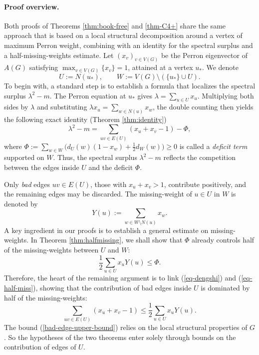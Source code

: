 \documentclass[10pt,a4paper]{amsart}
\renewcommand{\le}{\leqslant}
\renewcommand{\ge}{\geqslant}
\begin{document}
\paragraph{Proof overview.}
Both proofs of Theorems \ref{thm:book-free} and \ref{thm-C4+} share the same approach that is based on a local structural decomposition around a vertex of
maximum Perron weight, combining with an identity for the spectral surplus and a half-missing-weights estimate.   
Let $(x_v)_{v\in V(G)}$ be the Perron
eigenvector of $A(G)$ satisfying $\max_{v\in V(G)} \{x_v\}=1$, attained at a vertex
$u_*$. We denote 
\[ U:=N(u_*), \qquad W:=V(G)\setminus(\{u_*\}\cup U). \] 
To begin with, 
a standard step is to establish a formula that localizes the {spectral surplus}
$\lambda^2-m$. 
The Perron equation at $u_*$
gives $\lambda =\sum_{u\in U}x_u$. Multiplying both sides by $\lambda$ and substituting $\lambda x_u =\sum_{w\in N(u)} x_w$, the double counting then yields the following exact identity (Theorem \ref{thm:identity}) 
\begin{equation} \label{eq-dengshi}
\lambda^2-m=\sum_{uv\in E(U)}(x_u+x_v-1)-\Phi, 
\end{equation}
where $\Phi := \sum_{w\in W} \big(d_U(w)(1-x_w) + \frac{1}{2}d_W(w) \big) \ge 0$ is called a \emph{deficit term} supported on $W$. 
Thus, the spectral surplus $\lambda^2-m$ reflects the competition between the edges
inside $U$ and the deficit $\Phi$. 

Only \emph{bad} edges $uv\in E(U)$, those with $x_u+x_v >1$, 
contribute positively, and the remaining edges may be discarded. 
The missing-weight of $u\in U$ in $W$ is denoted by 
$$ Y(u):=\sum_{w\in W\setminus N(u)}x_w .$$ 
A key ingredient in our proofs is to establish a general estimate on missing-weights. In Theorem \ref{thm:halfmissing}, we shall show that $\Phi$ already controls
half of the missing-weights between $U$ and $W$:  
\begin{equation} \label{eq-half-miss}
     \frac12\sum_{u\in U}x_uY(u) \le \Phi. 
\end{equation} 
Therefore, the heart of the remaining argument is to link (\ref{eq-dengshi}) and (\ref{eq-half-miss}),  showing that the contribution of bad edges inside $U$ is dominated by half of the missing-weights:  
\begin{equation} \label{bad-edge-upper-bound}
  \sum_{uv\in E(U)}(x_u+x_v-1)\le \frac12\sum_{u\in U}x_uY(u). 
\end{equation}
The bound (\ref{bad-edge-upper-bound}) relies on the local structural properties of $G$. So the hypotheses of the two theorems enter solely through
bounds on the contribution of edges of $U$. 
\end{document}
